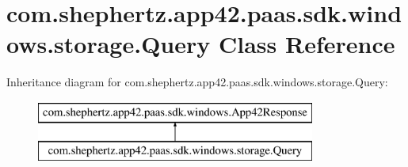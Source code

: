 \hypertarget{classcom_1_1shephertz_1_1app42_1_1paas_1_1sdk_1_1windows_1_1storage_1_1_query}{\section{com.\+shephertz.\+app42.\+paas.\+sdk.\+windows.\+storage.\+Query Class Reference}
\label{classcom_1_1shephertz_1_1app42_1_1paas_1_1sdk_1_1windows_1_1storage_1_1_query}
}
Inheritance diagram for com.\+shephertz.\+app42.\+paas.\+sdk.\+windows.\+storage.\+Query\+:\begin{figure}[H]
\begin{center}
\leavevmode
\includegraphics[height=2.000000cm]{classcom_1_1shephertz_1_1app42_1_1paas_1_1sdk_1_1windows_1_1storage_1_1_query}
\end{center}
\end{figure}
